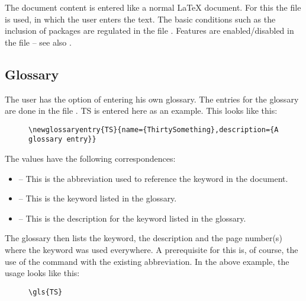 The document content is entered like a normal \LaTeX{} document. For this the
file  is used, in which the user enters
the text. The basic conditions such as the inclusion of packages are regulated
in the file . Features are enabled/disabled in the
file  -- see also .

\subsection{Glossary}

The user has the option of entering his own glossary. The entries for the
glossary are done in the file . \gls{TS}
is entered here as an example. This looks like this:

\begin{figure}[H]
    \scriptsize
    \centering
    \begin{BVerbatim}
\newglossaryentry{TS}{name={ThirtySomething},description={A glossary entry}}
    \end{BVerbatim}
\end{figure}

The values have the following correspondences:

\begin{itemize}
    \item {} -- This is the abbreviation used to reference the
          keyword in the document.
    \item {} -- This is the keyword listed in the
          glossary.
    \item {} -- This is the description for the
          keyword listed in the glossary.
\end{itemize}

The glossary then lists the keyword, the description and the page number(s)
where the keyword was used everywhere. A prerequisite for this is, of course,
the use of the command  with
the existing abbreviation. In the above example, the usage looks like this:

\begin{figure}[H]
    \small
    \centering
    \begin{BVerbatim}
\gls{TS}
    \end{BVerbatim}
\end{figure}

